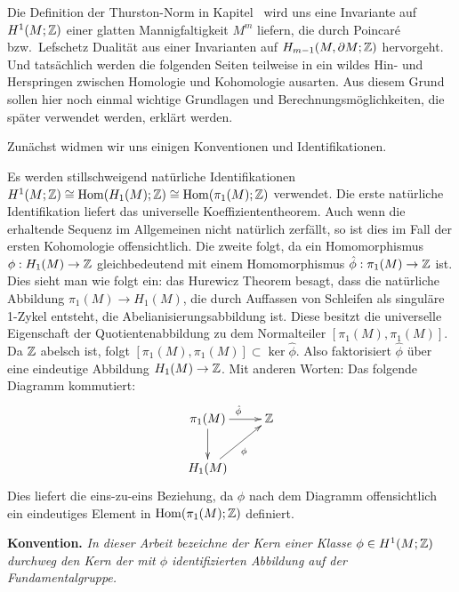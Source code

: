 	Die Definition der Thurston-Norm in Kapitel~ wird uns eine Invariante auf $H^1(M;\mathbb{Z})$ einer glatten Mannigfaltigkeit $M^m$ liefern, die durch Poincaré bzw.\ Lefschetz Dualität aus einer Invarianten auf $H_{m-1}(M,\partial M;\mathbb{Z})$ hervorgeht. Und tatsächlich werden die folgenden Seiten teilweise in ein wildes Hin- und Herspringen zwischen Homologie und Kohomologie ausarten. Aus diesem Grund sollen hier noch einmal wichtige Grundlagen und Berechnungsmöglichkeiten, die später verwendet werden, erklärt werden.

	Zunächst widmen wir uns einigen Konventionen und Identifikationen.
	        \begin{bem}
            \label{bem:fundhomologie}
            Es werden stillschweigend natürliche Identifikationen $H^1(M;\mathbb{Z}) \cong \operatorname{Hom}(H_1(M);\mathbb{Z}) \cong \operatorname{Hom}(\pi_1(M);\mathbb{Z})$ verwendet. Die erste natürliche Identifikation liefert das universelle Koeffiziententheorem. Auch wenn die erhaltende Sequenz im Allgemeinen nicht natürlich zerfällt, so ist dies im Fall der ersten Kohomologie offensichtlich. Die zweite folgt, da ein Homomorphismus $\phi: H_1(M) \to \mathbb{Z}$ gleichbedeutend mit einem Homomorphismus $\hat\phi : \pi_1(M) \to \mathbb{Z}$ ist. Dies sieht man wie folgt ein: das Hurewicz Theorem besagt, dass die natürliche Abbildung $\pi_1(M) \to H_1(M)$, die durch Auffassen von Schleifen als singuläre 1-Zykel entsteht, die Abelianisierungsabbildung ist. Diese besitzt die universelle Eigenschaft der Quotientenabbildung zu dem Normalteiler $[\pi_1(M),\pi_1(M)]$. Da $\mathbb{Z}$ abelsch ist, folgt $[\pi_1(M),\pi_1(M)] \subset \ker \hat \phi$. Also faktorisiert $\hat \phi$ über eine eindeutige Abbildung $H_1(M) \to \mathbb{Z}$. Mit anderen Worten: Das folgende Diagramm kommutiert:
            \[
                \begin{xy}
                    \xymatrix{\pi_1(M)\ar[r]^{\hat \phi} \ar[d] & \ZZ \\
                                H_1(M)\ar[ru]_\phi}
                \end{xy}
            \]
            Dies liefert die eins-zu-eins Beziehung, da $\phi$ nach dem Diagramm offensichtlich ein eindeutiges Element in $\operatorname{Hom}(\pi_1(M);\mathbb{Z})$ definiert. \\ \par
            \noindent\textbf{Konvention.} \emph{In dieser Arbeit bezeichne der Kern einer Klasse $\phi \in H^1(M;\mathbb{Z})$ durchweg den Kern der mit $\phi$ identifizierten Abbildung auf der Fundamentalgruppe.}\\ \par
        \end{bem}
